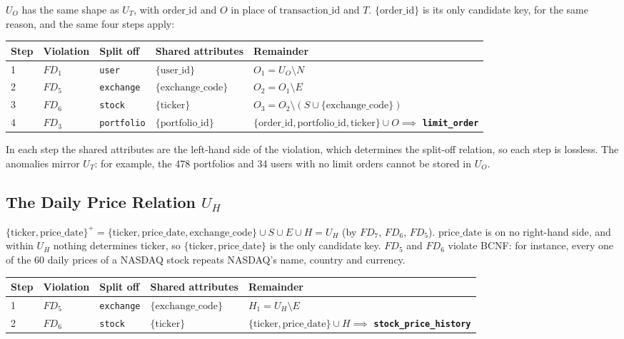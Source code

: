 \documentclass{article}
\newcommand{\at}[1]{\text{#1}}
\newcommand{\cl}[1]{\{#1\}^+}
\begin{document}
$U_O$ has the same shape as $U_T$, with $\at{order\_id}$ and $O$ in place of $\at{transaction\_id}$ and $T$. $\{\at{order\_id}\}$ is its only candidate key, for the same reason, and the same four steps apply:
\begin{center}
\begin{tabular}{l l l l l}
  \toprule
  \textbf{Step} & \textbf{Violation} & \textbf{Split off} & \textbf{Shared attributes} & \textbf{Remainder} \\
  \midrule
  1 & $FD_1$ & \texttt{user} & $\{\at{user\_id}\}$ & $O_1 = U_O \setminus N$ \\
  2 & $FD_5$ & \texttt{exchange} & $\{\at{exchange\_code}\}$ & $O_2 = O_1 \setminus E$ \\
  3 & $FD_6$ & \texttt{stock} & $\{\at{ticker}\}$ & $O_3 = O_2 \setminus (S \cup \{\at{exchange\_code}\})$ \\
  4 & $FD_3$ & \texttt{portfolio} & $\{\at{portfolio\_id}\}$ & $\{\at{order\_id}, \at{portfolio\_id}, \at{ticker}\} \cup O \implies$ \textbf{\texttt{limit\_order}} \\
  \bottomrule
\end{tabular}
\end{center}
In each step the shared attributes are the left-hand side of the violation, which determines the split-off relation, so each step is lossless. The anomalies mirror $U_T$: for example, the 478 portfolios and 34 users with no limit orders cannot be stored in $U_O$.

\subsection{The Daily Price Relation $U_H$}

$\cl{\at{ticker}, \at{price\_date}} = \{\at{ticker}, \at{price\_date}, \at{exchange\_code}\} \cup S \cup E \cup H = U_H$ (by $FD_7$, $FD_6$, $FD_5$). $\at{price\_date}$ is on no right-hand side, and within $U_H$ nothing determines $\at{ticker}$, so $\{\at{ticker}, \at{price\_date}\}$ is the only candidate key. $FD_5$ and $FD_6$ violate BCNF: for instance, every one of the 60 daily prices of a NASDAQ stock repeats NASDAQ's name, country and currency.
\begin{center}
\begin{tabular}{l l l l l}
  \toprule
  \textbf{Step} & \textbf{Violation} & \textbf{Split off} & \textbf{Shared attributes} & \textbf{Remainder} \\
  \midrule
  1 & $FD_5$ & \texttt{exchange} & $\{\at{exchange\_code}\}$ & $H_1 = U_H \setminus E$ \\
  2 & $FD_6$ & \texttt{stock} & $\{\at{ticker}\}$ & $\{\at{ticker}, \at{price\_date}\} \cup H \implies$ \textbf{\texttt{stock\_price\_history}} \\
  \bottomrule
\end{tabular}
\end{center}
\end{document}
